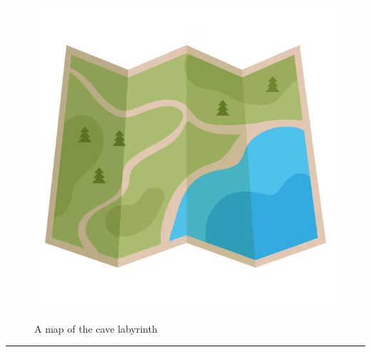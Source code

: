 \documentclass{article}
\begin{document}
    \begin{figure}[H]
        \centering
        \begin{minipage}{0.25\textwidth}
            \centering
            \includegraphics[width=\textwidth]{../SurvivalItemImages/map}
        \end{minipage}\hfill
        \begin{minipage}{0.7\textwidth}
            \centering
            \Large A map of the cave labyrinth
        \end{minipage}
    \end{figure}
    \vspace{-0.8em}
    \noindent\rule{\textwidth}{0.4pt}
            
\end{document}
